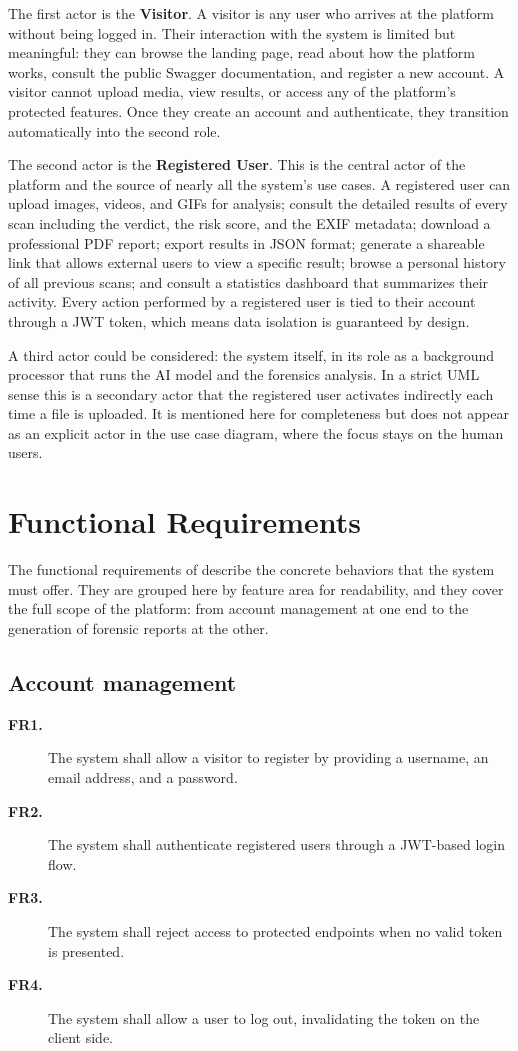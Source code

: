 The first actor is the \textbf{Visitor}. A visitor is any user who arrives at the platform without being logged in. Their interaction with the system is limited but meaningful: they can browse the landing page, read about how the platform works, consult the public Swagger documentation, and register a new account. A visitor cannot upload media, view results, or access any of the platform's protected features. Once they create an account and authenticate, they transition automatically into the second role.

The second actor is the \textbf{Registered User}. This is the central actor of the platform and the source of nearly all the system's use cases. A registered user can upload images, videos, and GIFs for analysis; consult the detailed results of every scan including the verdict, the risk score, and the EXIF metadata; download a professional PDF report; export results in JSON format; generate a shareable link that allows external users to view a specific result; browse a personal history of all previous scans; and consult a statistics dashboard that summarizes their activity. Every action performed by a registered user is tied to their account through a JWT token, which means data isolation is guaranteed by design.

A third actor could be considered: the system itself, in its role as a background processor that runs the AI model and the forensics analysis. In a strict UML sense this is a secondary actor that the registered user activates indirectly each time a file is uploaded. It is mentioned here for completeness but does not appear as an explicit actor in the use case diagram, where the focus stays on the human users.

\section{Functional Requirements}

The functional requirements of \deepguard{} describe the concrete behaviors that the system must offer. They are grouped here by feature area for readability, and they cover the full scope of the platform: from account management at one end to the generation of forensic reports at the other.

\subsection*{Account management}
\begin{description}
\item[\textbf{FR1.}] The system shall allow a visitor to register by providing a username, an email address, and a password.
\item[\textbf{FR2.}] The system shall authenticate registered users through a JWT-based login flow.
\item[\textbf{FR3.}] The system shall reject access to protected endpoints when no valid token is presented.
\item[\textbf{FR4.}] The system shall allow a user to log out, invalidating the token on the client side.
\end{description}

